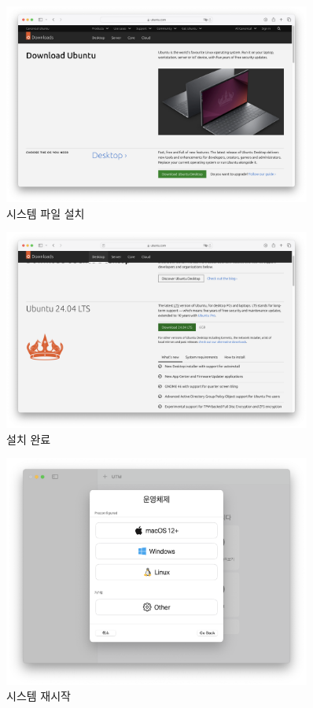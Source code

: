 \begin{figure}[htbp]
    \centering
    \includegraphics[width=0.9\textwidth]{images/chapter2Images/ch2_image_05.png}
    \caption{시스템 파일 설치}
\end{figure}

\begin{figure}[htbp]
    \centering
    \includegraphics[width=0.9\textwidth]{images/chapter2Images/ch2_image_06.png}
    \caption{설치 완료}
\end{figure}

\begin{figure}[htbp]
    \centering
    \includegraphics[width=0.9\textwidth]{images/chapter2Images/ch2_image_07.png}
    \caption{시스템 재시작}
\end{figure}

